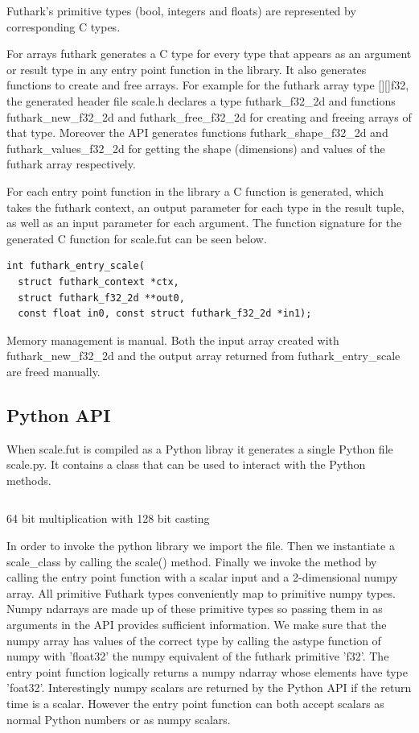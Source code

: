 \documentclass[11pt]{book}
\begin{document}
Futhark's primitive types (bool, integers and floats) are represented by corresponding C types.

For arrays futhark generates a C type for every type that appears as an argument or result type in any entry point function in the library. It also generates functions to create and free arrays. For example for the futhark array type [][]f32, the generated header file scale.h declares a type futhark\_f32\_2d and functions futhark\_new\_f32\_2d and futhark\_free\_f32\_2d for creating and freeing arrays of that type. Moreover the API generates functions futhark\_shape\_f32\_2d and futhark\_values\_f32\_2d for getting the shape (dimensions) and values of the futhark array respectively. 

For each entry point function in the library a C function is generated, which takes the futhark context, an output parameter for each type in the result tuple, as well as an input parameter for each argument. The function signature for the generated C function for scale.fut can be seen below.
\begin{verbatim}
int futhark_entry_scale(
  struct futhark_context *ctx,
  struct futhark_f32_2d **out0,
  const float in0, const struct futhark_f32_2d *in1);
\end{verbatim}

Memory management is manual. Both the input array created with futhark\_new\_f32\_2d and the output array returned from futhark\_entry\_scale are freed manually.

\subsection{Python API}

When scale.fut is compiled as a Python libray it generates a single Python file scale.py. It contains a class that can be used to interact with the Python methods.
\begin{listing}[H] 
        \inputminted[fontsize=\small,baselinestretch=0.5,linenos]{C}{code/compiler/api_examples/example.py}
        \caption{64 bit multiplication with 128 bit casting}
        \label{lst:int128}    
\end{listing} 


In order to invoke the python library we import the file. Then we instantiate a scale\_class by calling the scale() method. Finally we invoke the method by calling the entry point function with a scalar input and a 2-dimensional numpy array. All primitive Futhark types conveniently map to primitive numpy types. Numpy ndarrays are made up of these primitive types so passing them in as arguments in the API provides sufficient information. We make sure that the numpy array has values of the correct type by calling the astype function of numpy with 'float32' the numpy equivalent of the futhark primitive 'f32'. The entry point function logically returns a numpy ndarray whose elements have type 'foat32'. Interestingly numpy scalars are returned by the Python API if the return time is a scalar. However the entry point function can both accept scalars as normal Python numbers or as numpy scalars.
\end{document}
